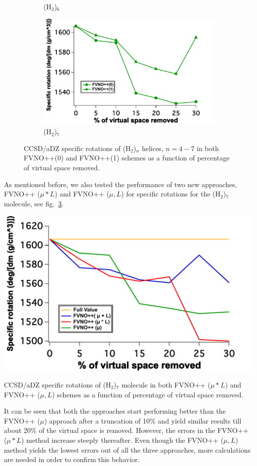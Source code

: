 \begin{figure}
\begin{subfigure}{.5\textwidth}
  \caption{(H$_2$)$_6$}
  \label{fig:sfig3}
\end{subfigure}%
\begin{subfigure}{.5\textwidth}
  \centering
  \includegraphics[width=.9\linewidth]{figures_fvno++/fvno++_cc2_1_h2_7_adz_optrot_lg.pdf}
  \caption{(H$_2$)$_7$}
  \label{fig:sfig4}
\end{subfigure}
\caption{{\footnotesize CCSD/aDZ specific rotations of
(H$_2$)$_n$ helices, $ n = 4-7$ in both FVNO++(0) and FVNO++(1) schemes as a function of percentage of virtual space removed.}}
\label{fig:fvno++_optrot_opt_h2_n}
\end{figure}
As mentioned before, we also tested the performance of two new approaches, FVNO++ ($\mu * L$) and FVNO++ ($\mu,L$) for specific rotations for the (H$_2$)$_7$ molecule, see fig.~\ref{fig:fvno++_optrot_opt_h2_n}.
\begin{MyFigure}[h!]
\centering
\includegraphics[width=0.6\linewidth]{figures_fvno++/fvno++_optrot_2_approaches}
\caption{{\footnotesize CCSD/aDZ specific rotations of
(H$_2$)$_7$ molecule in both FVNO++ ($\mu * L$) and FVNO++ ($\mu,L$) schemes as a function of percentage of virtual space removed.}}
\label{fig:fvno++_optrot_2_approaches}
\end{MyFigure}
It can be seen that both the approaches start performing better than the FVNO++ ($\mu$) approach after a truncation of 10\% and yield similar results till about 20\% of the virtual space is removed. However, the errors in the FVNO++ ($\mu * L$) method increase steeply thereafter. Even though the FVNO++ ($\mu,L$) method yields the lowest errors out of all the three approaches, more calculations are needed in order to confirm this behavior.

